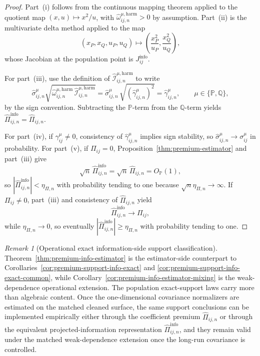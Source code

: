 \documentclass[11pt,a4paper]{amsart}
\theoremstyle{plain}
\theoremstyle{definition}
\theoremstyle{remark}
\newtheorem{remark}[theorem]{Remark}
\newcommand{\PP}{\mathbb{P}}
\newcommand{\QQ}{\mathbb{Q}}
\begin{document}
\begin{proof}
Part~(i) follows from the continuous mapping theorem applied to the quotient map
\((x,u)\mapsto x^2/u\), with
\(\widehat\omega_{ij,n}^{\mu,\mathrm{harm}}>0\) by assumption.  Part~(ii) is the multivariate delta
method applied to the map
\[
        (x_P,x_Q,u_P,u_Q)
        \longmapsto
        \left(
                \frac{x_P^2}{u_P},
                \frac{x_Q^2}{u_Q}
        \right),
\]
whose Jacobian at the population point is \(J_{ij}^{\mathrm{info}}\).

For part~(iii), use the definition of
\(\widehat{\mathcal I}_{ij,n}^{\mu,\mathrm{harm}}\) to write
\[
        \widehat\sigma_{ij,n}^\mu
        \sqrt{
                \widehat\omega_{ij,n}^{\mu,\mathrm{harm}}\,
                \widehat{\mathcal I}_{ij,n}^{\mu,\mathrm{harm}}
        }
        =
        \widehat\sigma_{ij,n}^\mu\,
        \sqrt{(\widehat\gamma_{ij,n}^\mu)^2}
        =
        \widehat\gamma_{ij,n}^\mu,
        \qquad
        \mu\in\{\PP,\QQ\},
\]
by the sign convention.  Subtracting the \(\PP\)-term from the \(\QQ\)-term yields
\(\widehat\Pi_{ij,n}^{\mathrm{info}}=\widehat\Pi_{ij,n}\).

For part~(iv), if \(\gamma_{ij}^\mu\neq0\), consistency of \(\widehat\gamma_{ij,n}^\mu\) implies
sign stability, so \(\widehat\sigma_{ij,n}^\mu\to\sigma_{ij}^\mu\) in probability.  For part~(v),
if \(\Pi_{ij}=0\), Proposition~\ref{thm:premium-estimator} and part~(iii) give
\[
        \sqrt{n}\,\widehat\Pi_{ij,n}^{\mathrm{info}}
        =
        \sqrt{n}\,\widehat\Pi_{ij,n}
        =O_\PP(1),
\]
so \(|\widehat\Pi_{ij,n}^{\mathrm{info}}|<\eta_{\Pi,n}\) with probability tending to one because
\(\sqrt{n}\eta_{\Pi,n}\to\infty\).  If \(\Pi_{ij}\neq0\), part~(iii) and consistency of
\(\widehat\Pi_{ij,n}\) yield
\[
        \widehat\Pi_{ij,n}^{\mathrm{info}}
        \to
        \Pi_{ij},
\]
while \(\eta_{\Pi,n}\to0\), so eventually
\(|\widehat\Pi_{ij,n}^{\mathrm{info}}|\ge \eta_{\Pi,n}\) with probability tending to one.
\end{proof}

\begin{remark}[Operational exact information-side support classification]\label{rem:premium-info-estimator}
Theorem~\ref{thm:premium-info-estimator} is the estimator-side counterpart to
Corollaries~\ref{cor:premium-support-info-exact} and
\ref{cor:premium-support-info-exact-common}, while
Corollary~\ref{cor:premium-info-estimator-mixing} is the weak-dependence operational extension.
The population exact-support laws carry more than algebraic content.  Once the
one-dimensional covariance normalizers are estimated on the matched cleaned surface, the same
support conclusions can be implemented empirically either through the coefficient premium
\(\widehat\Pi_{ij,n}\) or through the equivalent projected-information representation
\(\widehat\Pi_{ij,n}^{\mathrm{info}}\), and they remain valid under the matched weak-dependence
extension once the long-run covariance is controlled.
\end{remark}
\end{document}
